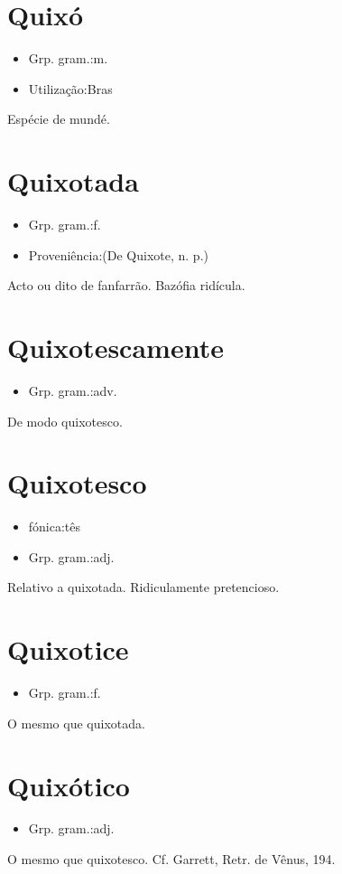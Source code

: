 \section{Quixó}
\begin{itemize}
\item {Grp. gram.:m.}
\end{itemize}
\begin{itemize}
\item {Utilização:Bras}
\end{itemize}
Espécie de mundé.
\section{Quixotada}
\begin{itemize}
\item {Grp. gram.:f.}
\end{itemize}
\begin{itemize}
\item {Proveniência:(De \textunderscore Quixote\textunderscore , n. p.)}
\end{itemize}
Acto ou dito de fanfarrão.
Bazófia ridícula.
\section{Quixotescamente}
\begin{itemize}
\item {Grp. gram.:adv.}
\end{itemize}
De modo quixotesco.
\section{Quixotesco}
\begin{itemize}
\item {fónica:tês}
\end{itemize}
\begin{itemize}
\item {Grp. gram.:adj.}
\end{itemize}
Relativo a quixotada.
Ridiculamente pretencioso.
\section{Quixotice}
\begin{itemize}
\item {Grp. gram.:f.}
\end{itemize}
O mesmo que \textunderscore quixotada\textunderscore .
\section{Quixótico}
\begin{itemize}
\item {Grp. gram.:adj.}
\end{itemize}
O mesmo que \textunderscore quixotesco\textunderscore . Cf. Garrett, \textunderscore Retr. de Vênus\textunderscore , 194.
